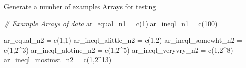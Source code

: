 \documentclass[
]{book}
\newenvironment{Shaded}{\begin{snugshade}}{\end{snugshade}}
\newcommand{\CommentTok}[1]{\textcolor[rgb]{0.56,0.35,0.01}{\textit{#1}}}
\newcommand{\DecValTok}[1]{\textcolor[rgb]{0.00,0.00,0.81}{#1}}
\newcommand{\FunctionTok}[1]{\textcolor[rgb]{0.00,0.00,0.00}{#1}}
\newcommand{\NormalTok}[1]{#1}
\newcommand{\OtherTok}[1]{\textcolor[rgb]{0.56,0.35,0.01}{#1}}
\newcommand{\SpecialCharTok}[1]{\textcolor[rgb]{0.00,0.00,0.00}{#1}}
\begin{document}
Generate a number of examples Arrays for testing

\begin{Shaded}
\begin{Highlighting}[]
\CommentTok{\# Example Arrays of data}
\NormalTok{ar\_equal\_n1 }\OtherTok{=} \FunctionTok{c}\NormalTok{(}\DecValTok{1}\NormalTok{)}
\NormalTok{ar\_ineql\_n1 }\OtherTok{=} \FunctionTok{c}\NormalTok{(}\DecValTok{100}\NormalTok{)}

\NormalTok{ar\_equal\_n2 }\OtherTok{=} \FunctionTok{c}\NormalTok{(}\DecValTok{1}\NormalTok{,}\DecValTok{1}\NormalTok{)}
\NormalTok{ar\_ineql\_alittle\_n2 }\OtherTok{=} \FunctionTok{c}\NormalTok{(}\DecValTok{1}\NormalTok{,}\DecValTok{2}\NormalTok{)}
\NormalTok{ar\_ineql\_somewht\_n2 }\OtherTok{=} \FunctionTok{c}\NormalTok{(}\DecValTok{1}\NormalTok{,}\DecValTok{2}\SpecialCharTok{\^{}}\DecValTok{3}\NormalTok{)}
\NormalTok{ar\_ineql\_alotine\_n2 }\OtherTok{=} \FunctionTok{c}\NormalTok{(}\DecValTok{1}\NormalTok{,}\DecValTok{2}\SpecialCharTok{\^{}}\DecValTok{5}\NormalTok{)}
\NormalTok{ar\_ineql\_veryvry\_n2 }\OtherTok{=} \FunctionTok{c}\NormalTok{(}\DecValTok{1}\NormalTok{,}\DecValTok{2}\SpecialCharTok{\^{}}\DecValTok{8}\NormalTok{)}
\NormalTok{ar\_ineql\_mostmst\_n2 }\OtherTok{=} \FunctionTok{c}\NormalTok{(}\DecValTok{1}\NormalTok{,}\DecValTok{2}\SpecialCharTok{\^{}}\DecValTok{13}\NormalTok{)}


\end{Highlighting}
\end{Shaded}
\end{document}
